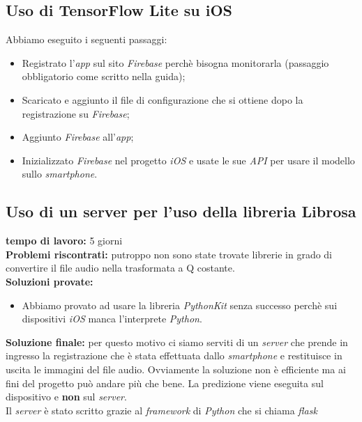 \subsection{Uso di TensorFlow Lite su iOS}
Abbiamo eseguito i seguenti passaggi:
\begin{itemize}
	\item Registrato l'\textit{app} sul sito \textit{Firebase} perchè bisogna monitorarla (passaggio obbligatorio come scritto nella guida);
	\item Scaricato e aggiunto il file di configurazione che si ottiene dopo la registrazione su \textit{Firebase};
	\item Aggiunto \textit{Firebase} all'\textit{app};
	\item Inizializzato \textit{Firebase} nel progetto \textit{iOS} e usate le sue \textit{API} per usare il modello sullo \textit{smartphone}.
\end{itemize}

\subsection{Uso di un server per l'uso della libreria Librosa}
\textbf{tempo di lavoro:} 5 giorni\\
\newline
\textbf{Problemi riscontrati:} putroppo non sono state trovate librerie in grado di convertire il file audio nella trasformata a Q costante.\\
\newline
%
\textbf{Soluzioni provate:}
\begin{itemize}
	\item Abbiamo provato ad usare la libreria \textit{PythonKit} senza successo perchè sui dispositivi \textit{iOS} manca l'interprete \textit{Python}.\\
\end{itemize}
%
\textbf{Soluzione finale:} per questo motivo ci siamo serviti di un \textit{server} che prende in ingresso la registrazione che è stata effettuata dallo \textit{smartphone} e restituisce in uscita le immagini del file audio. Ovviamente la soluzione non è efficiente ma ai fini del progetto può andare più che bene. La predizione viene eseguita sul dispositivo e \textbf{non} sul \textit{server}.\\
\newline
Il \textit{server} è stato scritto grazie al \textit{framework} di \textit{Python} che si chiama \textit{flask}


